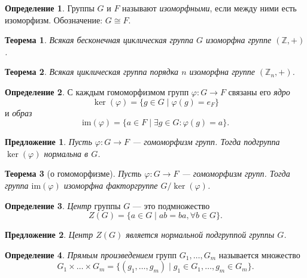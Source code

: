 \documentclass[a4paper]{article}
\theoremstyle{plain}
\newtheorem*{theorem}{Теорема}
\newtheorem{proposal}{Предложение}
\theoremstyle{definition}
\newtheorem{definition}{Определение}
\numberwithin{definition}{section}
\numberwithin{proposal}{section}
\newcommand{\im}{\mathrm{im}}
\begin{document}
\begin{definition}
Группы \(G\) и \(F\) называют \emph{изоморфными}, если между ними есть изоморфизм. Обозначение: \(G \cong F\).
\end{definition}

\begin{theorem}
Всякая бесконечная циклическая группа \(G\) изоморфна группе \((\mathbb{Z}, +)\).
\end{theorem}

\begin{theorem}
Всякая циклическая группа порядка \(n\) изоморфна группе \((\mathbb{Z}_n, +)\).
\end{theorem}

\begin{definition}
С каждым гомоморфизмом групп \(\varphi: G \rightarrow F\) связаны его \emph{ядро}
\begin{equation*}
	\ker(\varphi) = \{g \in G \;|\; \varphi(g) = e_F\}
\end{equation*}
и \emph{образ}
\begin{equation*}
	\im(\varphi) = \{a \in F \;|\; \exists g \in G: \varphi(g) = a\}.
\end{equation*}
\end{definition}

\begin{proposal}
Пусть \(\varphi: G \rightarrow F\) --- гомоморфизм групп. Тогда подгруппа \(\ker(\varphi)\) нормальна в \(G\).
\end{proposal}

\begin{theorem}[о гомоморфизме]
Пусть \(\varphi: G \rightarrow F\) --- гомоморфизм групп. Тогда группа \(\im(\varphi)\) изоморфна факторгруппе \(G/\ker(\varphi)\).
\end{theorem}

\begin{definition}
\emph{Центр} группы \(G\) --- это подмножество
\begin{equation*}
	Z(G) = \{a \in G \;|\; ab = ba, \forall b \in G\}.
\end{equation*}
\end{definition}

\begin{proposal}
Центр \(Z(G)\) является нормальной подгруппой группы \(G\).
\end{proposal}

\begin{definition}
\emph{Прямым произведением} групп \(G_1, \dots, G_m\) называется множество
\begin{equation*}
	G_1 \times \dots \times G_m = \{(g_1, \dots, g_m) \;|\; g_1 \in G_1, \dots, g_m \in G_m\}.
\end{equation*}
\end{definition}
\end{document}
